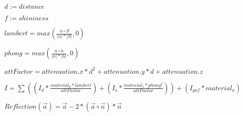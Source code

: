 $d := distance$

$f := shininess$

$
    lambert
=
    max\left(
        \frac{
            n
            \circ
            S
        }{
            | n | * | S |
        }
        , 
        0
    \right)
$

$
    phong
=
    max\left(
        \frac{n \circ h}{|n| * |h|}
        ,
        0
    \right)
$

$
    attFactor = attenuation.x * d^2 + attenuation.y * d + attenuation.z
$

$
    I
=
    \sum{}^{}
    \left(
        \left(
            I_d
            *
            \frac{
                material_d
                *
                lambert
            }{
                attFactor
            }
        \right)
        +
        \left(
            I_s
            *
            \frac{
                material_s
                *
                phong^{f}
            }{
                attFactor
            }
        \right)
    \right)
    +
    \left(
        I_{gaf}
        *
        material_a
    \right)
$

$
    Reflection(\vec{a})
=
    \vec{a} - 2 * (\vec{a} \circ \vec{n}) * \vec{n}
$